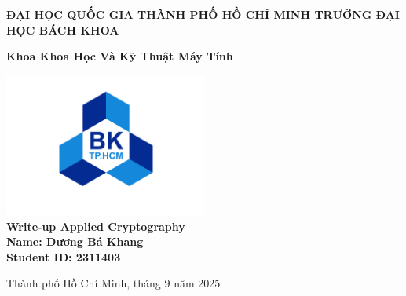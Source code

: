\documentclass[12pt, a4paper, oneside]{report}
\begin{document}
{
\thispagestyle{empty} 
\centering
    \vspace*{1cm}
    
    \Large
    \textbf{ĐẠI HỌC QUỐC GIA THÀNH PHỐ HỒ CHÍ MINH TRƯỜNG ĐẠI HỌC BÁCH KHOA}
    
    \vspace{0.5cm}
    \Large
    \textbf{Khoa Khoa Học Và Kỹ Thuật Máy Tính}
    
    \vspace{0.5cm}
    
    \includegraphics[width=0.5\textwidth]{01_logobachkhoasang.png}\\
    \large
    \vspace{0.5cm}
    \textbf{Write-up Applied Cryptography}
    \vspace{0.5cm}
    \large
    \\
    \textbf{Name: Dương Bá Khang}
    \vspace{0.5cm}
    \\
    \textbf{Student ID: 2311403} 
    \vfill
    
    \normalsize
    Thành phố Hồ Chí Minh, tháng 9 năm 2025
    
}
\patchcmd{\chapter}{\thispagestyle{plain}}{\thispagestyle{fancy}}{}{}
\tableofcontents
\newpage
\end{document}
